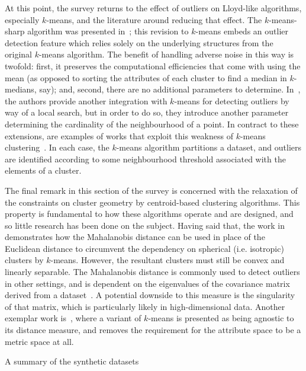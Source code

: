 At this point, the survey returns to the effect of outliers on Lloyd-like
algorithms, especially \(k\)-means, and the literature around reducing that
effect. The \(k\)-means-sharp algorithm was presented in~\cite{Olukanmi2017};
this revision to \(k\)-means embeds an outlier detection feature which relies
solely on the underlying structures from the original \(k\)-means algorithm. The
benefit of handling adverse noise in this way is twofold: first, it preserves
the computational efficiencies that come with using the mean (as opposed to
sorting the attributes of each cluster to find a median in \(k\)-medians, say);
and, second, there are no additional parameters to determine.
In~\cite{Gupta2017}, the authors provide another integration with \(k\)-means
for detecting outliers by way of a local search, but in order to do so, they
introduce another parameter determining the cardinality of the neighbourhood of
a point. In contract to these extensions, are examples of works that exploit
this weakness of \(k\)-means clustering~\cite{Lei2012,Wei2019}. In each case,
the \(k\)-means algorithm partitions a dataset, and outliers are identified
according to some neighbourhood threshold associated with the elements of a
cluster.

The final remark in this section of the survey is concerned with the relaxation
of the constraints on cluster geometry by centroid-based clustering algorithms.
This property is fundamental to how these algorithms operate and are designed,
and so little research has been done on the subject. Having said that, the work
in~\cite{Sung1998} demonstrates how the Mahalanobis distance can be used in
place of the Euclidean distance to circumvent the dependency on spherical (i.e.
isotropic) clusters by \(k\)-means. However, the resultant clusters must still
be convex and linearly separable. The Mahalanobis distance is commonly used to
detect outliers in other settings, and is dependent on the eigenvalues of the
covariance matrix derived from a dataset~\cite{Mahalanobis1936}. A potential
downside to this measure is the singularity of that matrix, which is
particularly likely in high-dimensional data. Another exemplar work
is~\cite{Statman2020}, where a variant of \(k\)-means is presented as being
agnostic to its distance measure, and removes the requirement for the attribute
space to be a metric space at all.

\begin{table}
    \centering
    \resizebox{\tabwidth}{!}{%
        
    }\caption{A summary of the synthetic datasets}\label{tab:datasets}
\end{table}

